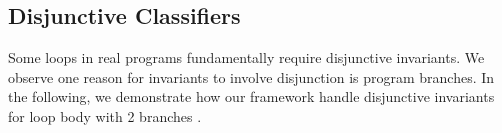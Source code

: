 \subsection{Disjunctive Classifiers}
Some loops in real programs fundamentally require disjunctive invariants. 
We observe one reason for invariants to involve disjunction is program branches.
In the following, we demonstrate how our framework handle disjunctive invariants for loop body with 2 branches .





